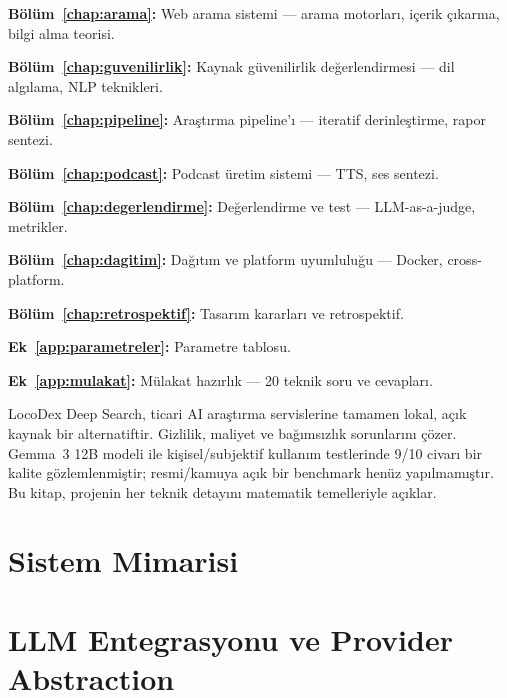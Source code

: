 \documentclass[12pt,a4paper,oneside]{book}
\theoremstyle{definition}
\begin{document}
\textbf{B\"{o}l\"{u}m~\ref{chap:arama}:} Web arama sistemi --- arama motorlar{\i}, i\c{c}erik \c{c}{\i}karma, bilgi alma teorisi.

\textbf{B\"{o}l\"{u}m~\ref{chap:guvenilirlik}:} Kaynak g\"{u}venilirlik de\u{g}erlendirmesi --- dil alg{\i}lama, NLP teknikleri.

\textbf{B\"{o}l\"{u}m~\ref{chap:pipeline}:} Ara\c{s}t{\i}rma pipeline'{\i} --- iteratif derinle\c{s}tirme, rapor sentezi.

\textbf{B\"{o}l\"{u}m~\ref{chap:podcast}:} Podcast \"{u}retim sistemi --- TTS, ses sentezi.

\textbf{B\"{o}l\"{u}m~\ref{chap:degerlendirme}:} De\u{g}erlendirme ve test --- LLM-as-a-judge, metrikler.

\textbf{B\"{o}l\"{u}m~\ref{chap:dagitim}:} Da\u{g}{\i}t{\i}m ve platform uyumlulu\u{g}u --- Docker, cross-platform.

\textbf{B\"{o}l\"{u}m~\ref{chap:retrospektif}:} Tasar{\i}m kararlar{\i} ve retrospektif.

\textbf{Ek~\ref{app:parametreler}:} Parametre tablosu.

\textbf{Ek~\ref{app:mulakat}:} M\"{u}lakat haz{\i}rl{\i}k --- 20 teknik soru ve cevaplar{\i}.

\begin{ozet}
LocoDex Deep Search, ticari AI ara\c{s}t{\i}rma servislerine tamamen lokal, a\c{c}{\i}k kaynak bir alternatiftir. Gizlilik, maliyet ve ba\u{g}{\i}ms{\i}zl{\i}k sorunlar{\i}n{\i} \c{c}\"{o}zer. Gemma~3 12B modeli ile ki\c{s}isel/subjektif kullan{\i}m testlerinde 9/10 civar{\i} bir kalite g\"{o}zlemlenmi\c{s}tir; resmi/kamuya a\c{c}{\i}k bir benchmark hen\"{u}z yap{\i}lmam{\i}\c{s}t{\i}r. Bu kitap, projenin her teknik detay{\i}n{\i} matematik temelleriyle a\c{c}{\i}klar.
\end{ozet}


\chapter{Sistem Mimarisi}
\label{chap:mimari}




\chapter{LLM Entegrasyonu ve Provider Abstraction}
\label{chap:llm}
\end{document}
